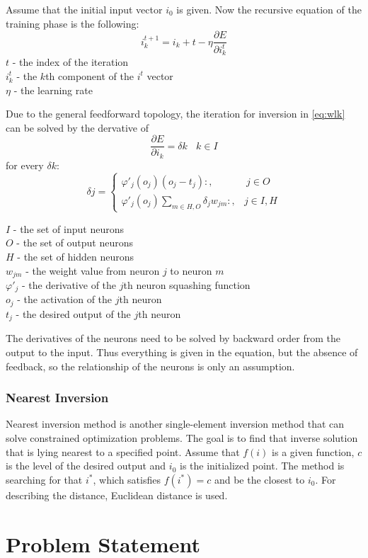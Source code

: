 Assume that the initial input vector $i_0$ is given. Now the recursive equation of the training phase is the following: 
\begin{equation} i_k^{t+1} = i_k+t - \eta \frac{\partial E}{\partial i_k^t} \label{eq:wlk} \end{equation} 
$t$ - the index of the iteration \\
$i_k^t$ - the $k$th component of the $i^t$ vector \\
$\eta$ - the learning rate \medskip

Due to the general feedforward topology, the iteration for inversion in \eqref{eq:wlk} can be solved by the dervative of 
$$ \frac{\partial E}{\partial i_k} = \delta k ~~~~ k \in I$$
for every $\delta k$:
$$ \delta j = \begin{cases} \varphi'_j(o_j)(o_j-t_j):, & ~ j \in O \\ 
\varphi'_j(o_j)\sum_{m\in H,O}\delta_j w_{jm}:, & j \in I, H \end{cases} $$

\noindent $I$ - the set of input neurons\\
$O$ - the set of output neurons\\
$H$ - the set of hidden neurons\\
$w_{jm}$ - the weight value from neuron $j$ to neuron $m$\\
$\varphi'_j$ - the derivative of the $j$th neuron squashing function\\
$o_j$ - the activation of the $j$th neuron\\
$t_j$ - the desired output of the $j$th neuron \medskip

The derivatives of the neurons need to be solved by backward order from the output to the input. Thus everything is given in the equation, but the absence of feedback, so the relationship of the neurons is only an assumption.



\subsubsection{Nearest Inversion}

Nearest inversion method is another single-element inversion method that can solve constrained optimization problems. The goal is to find that inverse solution that is lying nearest to a specified point. 
Assume that $f(i)$ is a given function, $c$ is the level of the desired output and $i_0$ is the initialized point. The method is searching for that $i^*$, which satisfies $f(i^*) = c$ and be the closest to $i_0$. For describing the distance, Euclidean distance is used.




\section{Problem Statement}

